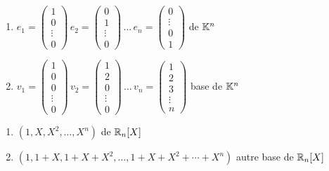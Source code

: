 \begin{frame}
\begin{exemple}
\begin{enumerate}
\item
$
e_1 = \left(\begin{smallmatrix}1\\0\\\vdots\\0\end{smallmatrix} \right)\, 
e_2 = \left(\begin{smallmatrix}0\\1\\\vdots\\0\end{smallmatrix}\right) \, \ldots  \,
e_n = \left(\begin{smallmatrix}0\\\vdots\\0\\1\end{smallmatrix}\right)$
  de $\mathbb{K}^n$

 \medskip
\pause
\item $v_1 = \left(\begin{smallmatrix}1\\0\\0\\\vdots\\0\end{smallmatrix}\right) \,
v_2 = \left(\begin{smallmatrix}1\\2\\0\\\vdots\\0\end{smallmatrix}\right) \, \ldots \, 
v_n = \left(\begin{smallmatrix}1\\2\\3\\\vdots\\n\end{smallmatrix}\right)$ \quad base de $\mathbb{K}^n$

\end{enumerate}
\end{exemple}
\end{frame}


\begin{frame}
\begin{exemple}{\small
\begin{enumerate}
\item  $(1,X,X^2, \ldots , X^n)$  de $\mathbb{R}_n[X]$ 

\pause
\medskip
\item
  $ (1,1+X,1+X+X^2,\ldots,1+X+X^2+\cdots+X^n)$ autre base de $\mathbb{R}_n[X]$
  

\end{enumerate}}
\end{exemple}
\end{frame}
